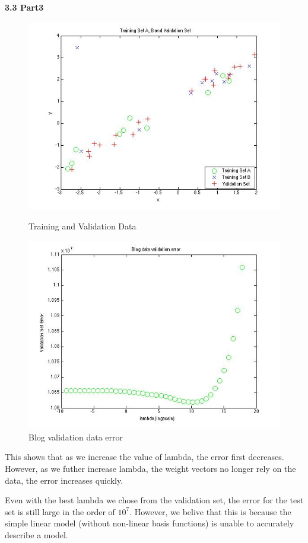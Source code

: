 {\bfseries 3.3 Part3}
\begin{figure}[!htb]
  \includegraphics[width=\linewidth]{figures/p3_training_validation_data}
  \caption{Training and Validation Data}\label{fig:figures/p3_training_validation_data}
  \endminipage\hfill
  \includegraphics[width=\linewidth]{figures/p3_blogdata_lambda}
  \caption{Blog validation data error}
  \endminipage\hfill
\end{figure}

This shows that as we increase the value of lambda, the error first decreases. However, as we futher
increase lambda, the weight vectors no longer rely on the data, the error increases quickly. 


Even with the best lambda we chose from the validation set, the error for the test set is still large
in the order of $10^{7}$. However, we belive that this is because the simple linear model (without non-linear basis functions) is unable to accurately describe a model. 
